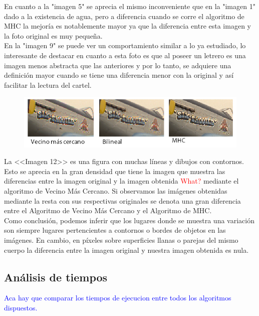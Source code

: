 \documentclass[a4paper]{article}
\begin{document}
En cuanto a la "imagen 5" se aprecia el mismo inconveniente que en la "imagen 1" dado a la existencia de agua, pero a diferencia cuando se corre el algoritmo de MHC la mejor\'ia es notablemente mayor ya que la diferencia entre esta imagen y la foto original es muy peque\~na.\\

En la "imagen 9" se puede ver un comportamiento similar a lo ya estudiado, lo interesante de destacar en cuanto a esta foto es que al poseer un letrero es una imagen menos abstracta que las anteriores y por lo tanto, se adquiere una definici\'on mayor cuando se tiene una diferencia menor con la original y as\'i facilitar la lectura del cartel.


\begin{figure}[h!]
	\caption{}
	\begin{center}
	\includegraphics[scale=0.05]{imagenes/comparacion/cartel}
	\label{cartel}
  \end{center}
\end{figure}


La <<Imagen 12>> es una figura con muchas l\'ineas y dibujos con contornos. Esto se aprecia en la gran densidad que tiene la imagen que muestra las diferencias entre la imagen original y la imagen obtenida \textcolor{red}{What?} mediante el algoritmo de Vecino M\'as Cercano. Si observamos las im\'agenes obtenidas mediante la resta con sus respectivas originales se denota una gran diferencia entre el Algoritmo de Vecino M\'as Cercano y el Algoritmo de MHC.\\

Como conclusi\'on, podemos inferir que los lugares donde se muestra una variaci\'on son siempre lugares pertencientes a contornos o bordes de objetos en las im\'agenes. En cambio, en p\'ixeles sobre superficies llanas o parejas del mismo cuerpo la diferencia entre la imagen original y nuestra imagen obtenida es nula.

\newpage
\subsection{An\'alisis de tiempos}
\textcolor{blue}{Aca hay que comparar los tiempos de ejecucion entre todos los algoritmos dispuestos.}
\end{document}
